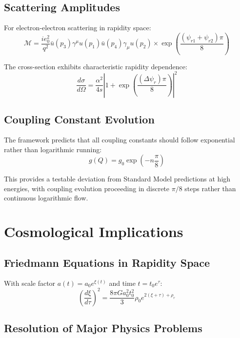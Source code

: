 \documentclass[12pt,a4paper]{article}
\begin{document}
\subsection{Scattering Amplitudes}

For electron-electron scattering in rapidity space:
\begin{equation}
\mathcal{M} = \frac{ie_0^2}{q^2} \bar{u}(p_3)\gamma^{\mu} u(p_1) \bar{u}(p_4)\gamma_{\mu} u(p_2) \times \exp\left(\frac{(\psi_{r1} + \psi_{r2})\pi}{8}\right)
\end{equation}

The cross-section exhibits characteristic rapidity dependence:
\begin{equation}
\frac{d\sigma}{d\Omega} = \frac{\alpha^2}{4s} \left|1 + \exp\left(\frac{(\Delta\psi_r)\pi}{8}\right)\right|^2
\end{equation}

\subsection{Coupling Constant Evolution}

The framework predicts that all coupling constants should follow exponential rather than logarithmic running:
\begin{equation}
g(Q) = g_0 \exp\left(-n \frac{\pi}{8}\right)
\end{equation}

This provides a testable deviation from Standard Model predictions at high energies, with coupling evolution proceeding in discrete $\pi/8$ steps rather than continuous logarithmic flow.

\section{Cosmological Implications}

\subsection{Friedmann Equations in Rapidity Space}

With scale factor $a(t) = a_0 e^{\xi(t)}$ and time $t = t_0 e^{\tau}$:
\begin{equation}
\left(\frac{d\xi}{d\tau}\right)^2 = \frac{8\pi G a_0^2 t_0^2}{3} \rho_0 e^{2(\xi+\tau)+\rho_r}
\end{equation}

\subsection{Resolution of Major Physics Problems}
\end{document}

